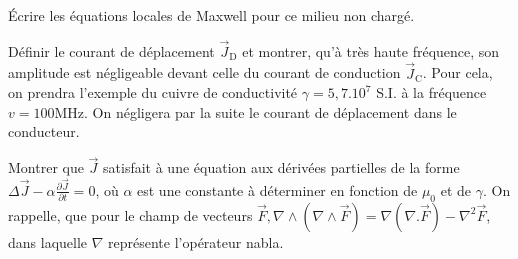         \begin{quest}
        \item Écrire les équations locales de Maxwell pour ce milieu non chargé.
        \item Définir le courant de déplacement \(\Vec{J}_{\mathrm{D}}\) et montrer, qu'à très haute fréquence, son amplitude est négligeable devant celle du courant de conduction \(\Vec{J}_{\mathrm{C}}\). Pour cela, on prendra l'exemple du cuivre de conductivité \(\gamma=5,7.10^{7}\) S.I. à la fréquence \(v=100 \mathrm{MHz}\). On négligera par la suite le courant de déplacement dans le conducteur.
        
        \item Montrer que \(\Vec{J}\) satisfait à une équation aux dérivées partielles de la forme \(\Delta \Vec{J}-\alpha \frac{\partial \Vec{J}}{\partial t}=0\), où \(\alpha\) est une constante à déterminer en fonction de \(\mu_{0}\) et de \(\gamma\). On rappelle, que pour le champ de vecteurs \(\Vec{F}, \nabla \wedge(\nabla \wedge \Vec{F})=\nabla(\nabla . \Vec{F})-\nabla^{2} \Vec{F}\), dans laquelle \(\nabla\) représente l'opérateur nabla.
        

\end{quest}
